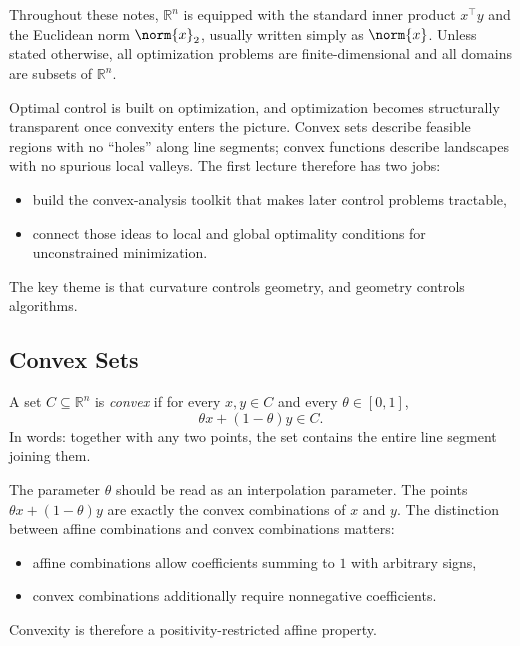 \label{lec:l1}

\begin{notation}
	Throughout these notes, $\mathbb{R}^n$ is equipped with the standard inner product $x^\top y$ and the Euclidean norm $\norm{x}_2$, usually written simply as $\norm{x}$. Unless stated otherwise, all optimization problems are finite-dimensional and all domains are subsets of $\mathbb{R}^n$.
\end{notation}

\begin{intuition}
	Optimal control is built on optimization, and optimization becomes structurally transparent once convexity enters the picture. Convex sets describe feasible regions with no ``holes'' along line segments; convex functions describe landscapes with no spurious local valleys. The first lecture therefore has two jobs:
	\begin{itemize}
		\item build the convex-analysis toolkit that makes later control problems tractable,
		\item connect those ideas to local and global optimality conditions for unconstrained minimization.
	\end{itemize}
	The key theme is that curvature controls geometry, and geometry controls algorithms.
\end{intuition}

\subsection{Convex Sets}
\label{sec:l1-convex-sets}

\begin{definition}\label{def:l1-convex-set}
	A set $C \subseteq \mathbb{R}^n$ is \emph{convex} if for every $x,y \in C$ and every $\theta \in [0,1]$,
	\[
		\theta x + (1-\theta) y \in C.
	\]
	In words: together with any two points, the set contains the entire line segment joining them.
\end{definition}

\begin{remark}
	The parameter $\theta$ should be read as an interpolation parameter. The points $\theta x + (1-\theta)y$ are exactly the convex combinations of $x$ and $y$. The distinction between affine combinations and convex combinations matters:
	\begin{itemize}
		\item affine combinations allow coefficients summing to $1$ with arbitrary signs,
		\item convex combinations additionally require nonnegative coefficients.
	\end{itemize}
	Convexity is therefore a positivity-restricted affine property.
\end{remark}

